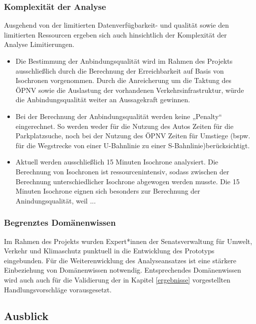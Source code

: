 \subsubsection{Komplexität der Analyse}
Ausgehend von der limitierten Datenverfügbarkeit- und qualität sowie den limitierten Ressourcen ergeben sich auch hinsichtlich der Komplexität der Analyse Limitierungen. 

\begin{itemize}

    \item Die Bestimmung der Anbindungsqualität wird im Rahmen des Projekts ausschließlich durch die Berechnung der Erreichbarkeit auf Basis von Isochronen vorgenommen. Durch die Anreicherung um die Taktung des ÖPNV sowie die Auslastung der vorhandenen Verkehrsinfrastruktur, würde die Anbindungsqualität weiter an Aussagekraft gewinnen. 
    
    \item Bei der Berechnung der Anbindungsqualität werden keine „Penalty“ eingerechnet. So werden weder für die Nutzung des Autos Zeiten für die Parkplatzsuche, noch bei der Nutzung des ÖPNV Zeiten für Umstiege (bspw. für die Wegstrecke von einer U-Bahnlinie zu einer S-Bahnlinie)berücksichtigt. 
    \item Aktuell werden ausschließlich 15 Minuten Isochrone analysiert​. Die Berechnung von Isochronen ist ressourcenintensiv, sodass zwischen der Berechnung unterschiedlicher Isochrone abgewogen werden musste. Die 15 Minuten Isochrone eignen sich besonders zur Berechnung der Anindungsqualität, weil ...
\end{itemize}


\subsubsection{Begrenztes Domänenwissen}
Im Rahmen des Projekts wurden Expert*innen der Senatsverwaltung für Umwelt, Verkehr und Klimaschutz punktuell in die Entwicklung des Prototyps eingebunden. Für die Weiterenwicklung des Analyseansatzes ist eine stärkere Einbeziehung von Domänenwissen notwendig. Entsprechendes Domänenwissen wird auch auch für die Validierung der in Kapitel \ref{ergebnisse} vorgestellten Handlungsvorschläge vorausgesetzt.


\subsection{Ausblick}

